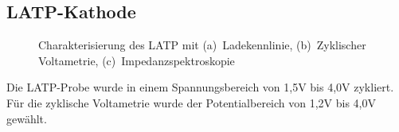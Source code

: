 \documentclass[a4paper, 11pt, headsepline,footsepline,twoside,abstract]{scrbook}
\begin{document}
\subsection{LATP-Kathode}
\begin{figure}
   \centering
       \vspace{3mm}
       \vspace{3mm}
       \vspace{3mm}
	\caption{Charakterisierung des LATP mit (a)~Ladekennlinie, (b)~Zyklischer Voltametrie, (c)~Impedanzspektroskopie}
   	\label{ec_LATP}
\end{figure}
Die LATP-Probe wurde in einem Spannungsbereich von 1,5V bis 4,0V zykliert. Für die zyklische Voltametrie wurde der Potentialbereich von 1,2V bis 4,0V gewählt.
\end{document}

